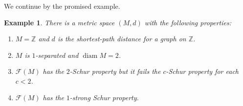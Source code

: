 \documentclass{amsart}
\numberwithin{equation}{section}
\newtheorem{example}[thm]{Example}
\theoremstyle{definition}
\def\F{\mathcal F}
\def\diam{\operatorname{diam}}
\def\zet{\mathbb Z}
\begin{document}
We continue by the promised example.

\begin{example}\label{ex:LF}
There is a metric space $(M,d)$ with the following properties:
\begin{enumerate}[$(a)$]
    \item $M=\zet$ and $d$ is the shortest-path distance for a graph on $\zet$.
    \item $M$ is $1$-separated and $\diam M=2$.
    \item $\F(M)$ has the $2$-Schur property but it fails the $c$-Schur property for each $c<2$.
    \item $\F(M)$ has the $1$-strong Schur property.
\end{enumerate}
    
\end{example}
\end{document}
